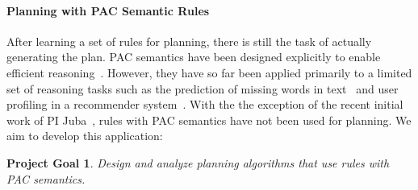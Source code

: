 \documentclass[12pt]{article}
\newcommand{\note}[1]{\textbf{\textit{#1}}}
\newtheorem{problem}{Project Goal}
\begin{document}




\paragraph{Planning with PAC Semantic Rules}


After learning a set of rules for planning, there is still the task of actually generating the plan. PAC semantics have been designed explicitly to enable efficient reasoning~\cite{valiant2000robustLogics}. However, they have so far been applied primarily to a limited set of reasoning tasks such as the prediction of missing words in text~\cite{michael2008first} and user profiling in a recommender system~\cite{semeraro2009knowledge}. With the the exception of the recent initial work of PI Juba~\cite{juba2016jmlr}, rules with PAC semantics have not been used for planning. We aim to develop this application:
\begin{problem}
Design and analyze planning algorithms that use rules with PAC semantics.
\end{problem}

\end{document}
